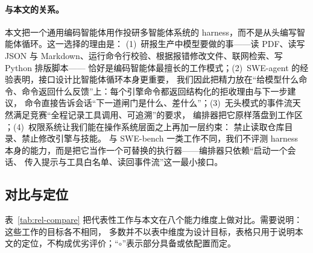 \paragraph{与本文的关系。}
本文把一个通用编码智能体用作投研多智能体系统的 harness，而不是从头编写智能体循环。这一选择的理由是：
(1)~研报生产中模型要做的事——读 PDF、读写 JSON 与 Markdown、运行命令行校验、根据报错修改文件、联网检索、写 Python 排版脚本——
恰好是编码智能体最擅长的工作模式；(2)~SWE-agent 的经验表明，接口设计比智能体循环本身更重要，
我们因此把精力放在“给模型什么命令、命令返回什么反馈”上：每个引擎命令都返回结构化的拒收理由与下一步建议，
 命令直接告诉会话“下一道闸门是什么、差什么”；(3)~无头模式的事件流天然满足竞赛“全程记录工具调用、可追溯”的要求，
编排器把它原样落盘到工作区 ；(4)~权限系统让我们能在操作系统层面之上再加一层约束：
禁止读取仓库目录、禁止修改引擎与技能。
与 SWE-bench 一类工作不同，我们不评测 harness 本身的能力，而是把它当作一个可替换的执行器——编排器只依赖“启动一个会话、
传入提示与工具白名单、读回事件流”这一最小接口。

\subsection{对比与定位}
\label{sec:rel-compare}

表~\ref{tab:rel-compare} 把代表性工作与本文在八个能力维度上做对比。需要说明：这些工作的目标各不相同，
多数并不以表中维度为设计目标，表格只用于说明本文的定位，不构成优劣评价；“$\circ$”表示部分具备或依配置而定。

